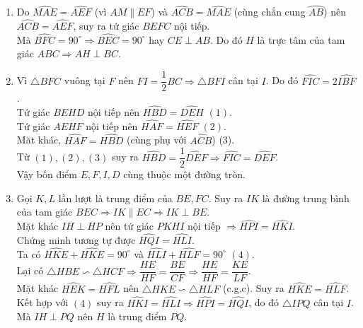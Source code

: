 \begin{ex}
{\begin{enumerate}
\begin{center}
    \end{center}
    \item Do $\widehat{MAE}=\widehat{AEF}$ (vì $AM \parallel EF$) và $\widehat{ACB}=\widehat{MAE}$ (cùng chắn cung $\wideparen{AB}$) nên $\widehat{ACB}=\widehat{AEF}$, suy ra tứ giác $BEFC$ nội tiếp.\\
    Mà $\widehat{BFC}=90^\circ \Rightarrow \widehat{BEC}=90^\circ$ hay $CE\perp AB$. Do đó $H$ là trực tâm của tam giác $ABC \Rightarrow AH\perp BC$.  
    \item Vì $\triangle BFC$ vuông tại $F$ nên $FI=\dfrac{1}{2}BC\Rightarrow \triangle BFI$ cân tại $I$. Do đó $\widehat{FIC}=2\widehat{IBF}$.\\
   	Tứ giác $BEHD$ nội tiếp nên $\widehat{HBD}=\widehat{DEH}\,\,(1)$.\\
   	Tứ giác $AEHF$ nội tiếp nên $\widehat{HAF}=\widehat{HEF} \,\, (2)$.\\
    Măt khác, $\widehat{HAF}=\widehat{HBD}$ (cùng phụ với $\widehat{ACB}$)  (3).\\
    Từ $(1),(2),(3)$ suy ra $\widehat{HBD}=\dfrac{1}{2}\widehat{DEF}\Rightarrow \widehat{FIC}=\widehat{DEF}$.\\
    Vậy bốn điểm $E,F,I,D$ cùng thuộc một đường tròn.
    \item Gọi $K,L$ lần lượt là trung điểm của $BE, FC$. Suy ra $IK$ là đường trung bình của tam giác $BEC \Rightarrow IK \parallel EC \Rightarrow IK \perp BE$. \\
    Mặt khác $IH\perp HP$ nên tứ giác $PKHI$ nội tiếp $\Rightarrow \widehat{HPI}=\widehat{HKI}.$\\
    Chứng minh tương tự được $\widehat{HQI}=\widehat{HLI}$.\\
    Ta có $\widehat{HKE}+\widehat{HKE}=90^\circ$ và $\widehat{HLI}+\widehat{HLF}=90^\circ\,\,(4)$.\\
    Lại có $\triangle HBE \backsim \triangle HCF \Rightarrow \dfrac{HE}{HF}=\dfrac{BE}{CF}\Rightarrow \dfrac{HE}{HF}=\dfrac{KE}{LF}$.\\
    Mặt khác $\widehat{HEK}=\widehat{HFL}$ nên $\triangle HKE \backsim \triangle HLF$ (c.g.c). Suy ra $\widehat{HKE}=\widehat{HLF}$. Kết hợp với $(4)$ suy ra $\widehat{HKI}=\widehat{HLI}\Rightarrow \widehat{HPI}=\widehat{HQI}$, do đó $\triangle IPQ$ cân tại $I$. Mà $IH\perp PQ$ nên $H$ là trung điểm $PQ$.
    
    \end{enumerate}
    }
\end{ex}

